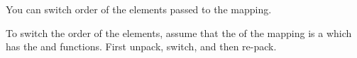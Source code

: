 

\begin{hint}
    You can switch order of the elements passed to the  mapping.

    To switch the order of the elements, assume that the  of the mapping is a  which has the  and  functions.
    First unpack, switch, and then re-pack.
\end{hint}